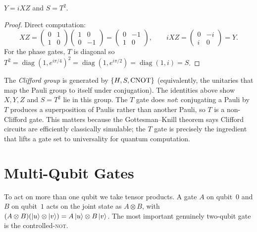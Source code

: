\begin{proposition}
\label{l2:prop:yxz}
$Y=iXZ$ and $S=T^{2}$.
\end{proposition}

\begin{proof}
Direct computation:
\[
  XZ=\begin{pmatrix}0&1\\1&0\end{pmatrix}
     \begin{pmatrix}1&0\\0&-1\end{pmatrix}
    =\begin{pmatrix}0&-1\\1&0\end{pmatrix},\qquad
  iXZ=\begin{pmatrix}0&-i\\i&0\end{pmatrix}=Y.
\]
For the phase gates, $T$ is diagonal so
$T^{2}=\operatorname{diag}(1,e^{i\pi/4})^{2}=\operatorname{diag}(1,e^{i\pi/2})
=\operatorname{diag}(1,i)=S$.
\end{proof}

\begin{remark}
The \emph{Clifford group} is generated by $\{H,S,\mathrm{CNOT}\}$ (equivalently, the
unitaries that map the Pauli group to itself under conjugation). The identities
above show $X,Y,Z$ and $S=T^{2}$ lie in this group. The $T$ gate does
\emph{not}: conjugating a Pauli by $T$ produces a superposition of Paulis rather
than another Pauli, so $T$ is a non-Clifford gate. This matters because the
Gottesman--Knill theorem says Clifford circuits are efficiently classically
simulable; the $T$ gate is precisely the ingredient that lifts a gate set to
universality for quantum computation.
\end{remark}

\section{Multi-Qubit Gates}

To act on more than one qubit we take tensor products. A gate $A$ on qubit~$0$
and $B$ on qubit~$1$ acts on the joint state as $A\otimes B$, with
$(A\otimes B)(\ket{u}\otimes\ket{v})=A\ket{u}\otimes B\ket{v}$. The most
important genuinely two-qubit gate is the controlled-\textsc{not}.

